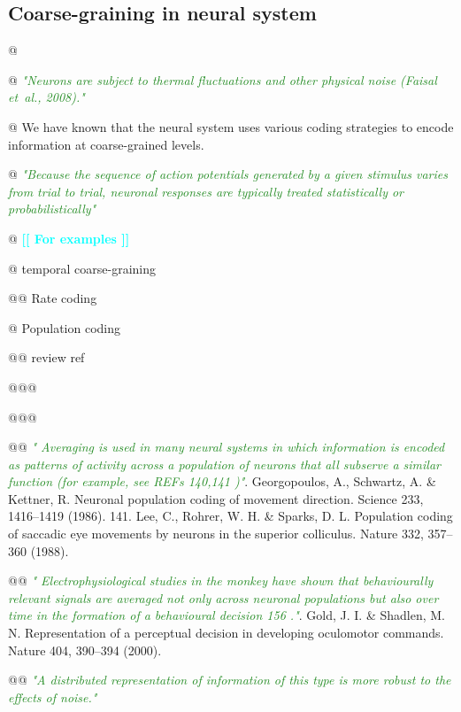 \documentclass[utf8]{article}
\newenvironment{ants}
			{
			 \begin{easylist}[itemize]		
		 	}
			{
			\end{easylist}
			}
\newcommand{\rewrite}[1]{\textcolor{ForestGreen}{\textit{"#1"}}\newline}
\newcommand{\toWrite}[1]{\noindent
			\textcolor{Cyan}{\textbf{[[ #1 ]]}}}
\begin{document}
		\subsection{Coarse-graining in neural system}
			\begin{ants}
				@ 
				
				
				@ \rewrite{Neurons are subject to thermal fluctuations and other physical noise (Faisal et al., 2008).} \cite{faisal2008noise}				
				
				@ We have known that the neural system uses various coding strategies to encode information at coarse-grained levels. 
				
				@ \rewrite{Because the sequence of action potentials generated by a given stimulus varies from trial to trial, neuronal responses are typically treated statistically or probabilistically}
				
				@ \toWrite{For examples}
				 
				 
				 
				@ temporal coarse-graining
				
					@@ Rate coding
						\cite{stein2005neuronal}

					
				
				

				@ Population coding
				
					@@ review ref
					
						@@@ \cite{Stanley2013}		
					
						@@@ \cite{QuianQuiroga2009}
						
					@@ \rewrite{
						Averaging is used in many neural systems in which information is encoded as patterns of activity across a population of neurons that all subserve a similar function (for example, see REFs 140,141 )}
										140. Georgopoulos, A., Schwartz, A. \& Kettner, R. Neuronal population coding of movement direction. Science 233, 1416–1419 (1986). 141. Lee, C., Rohrer, W. H. \& Sparks, D. L. Population coding of saccadic eye movements by neurons in the superior colliculus. Nature 332, 357–360 (1988).
										
					@@ \rewrite{
						Electrophysiological studies in the monkey have shown that behaviourally relevant signals are averaged not only across neuronal populations but also over time in the formation of a behavioural decision 156 .} 156. Gold, J. I. \& Shadlen, M. N. Representation of a perceptual decision in developing oculomotor commands. Nature 404, 390–394 (2000).
					
					
					@@ \rewrite{A distributed representation of information of this type is more robust to the effects of noise.}
				

\end{ants}
\end{document}
